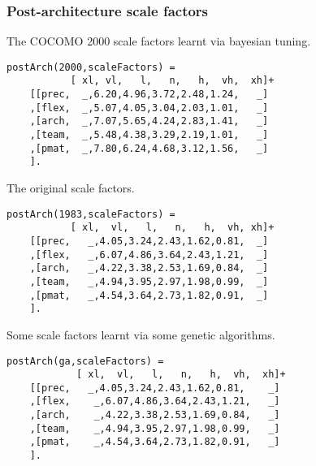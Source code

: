 \subsubsection{ Post-architecture scale factors
}
 The COCOMO 2000 scale factors learnt
via bayesian tuning.  \begin{Verbatim}
postArch(2000,scaleFactors) =
           [ xl, vl,   l,   n,   h,  vh,  xh]+
    [[prec,  _,6.20,4.96,3.72,2.48,1.24,   _]
    ,[flex,  _,5.07,4.05,3.04,2.03,1.01,   _]
    ,[arch,  _,7.07,5.65,4.24,2.83,1.41,   _]
    ,[team,  _,5.48,4.38,3.29,2.19,1.01,   _]
    ,[pmat,  _,7.80,6.24,4.68,3.12,1.56,   _]
    ].
\end{Verbatim}
 The original scale factors.  \begin{Verbatim}
postArch(1983,scaleFactors) =
           [ xl,  vl,   l,   n,   h,  vh, xh]+
    [[prec,   _,4.05,3.24,2.43,1.62,0.81,  _]
    ,[flex,   _,6.07,4.86,3.64,2.43,1.21,  _]
    ,[arch,   _,4.22,3.38,2.53,1.69,0.84,  _]
    ,[team,   _,4.94,3.95,2.97,1.98,0.99,  _]
    ,[pmat,   _,4.54,3.64,2.73,1.82,0.91,  _]
    ].
\end{Verbatim}
 Some scale factors learnt via some
genetic algorithms.  \begin{Verbatim}
postArch(ga,scaleFactors) =
            [ xl,  vl,   l,   n,   h,  vh,  xh]+
    [[prec,   _,4.05,3.24,2.43,1.62,0.81,    _]
    ,[flex,    _,6.07,4.86,3.64,2.43,1.21,   _]
    ,[arch,    _,4.22,3.38,2.53,1.69,0.84,   _]
    ,[team,    _,4.94,3.95,2.97,1.98,0.99,   _]
    ,[pmat,    _,4.54,3.64,2.73,1.82,0.91,   _]
    ].
\end{Verbatim}
